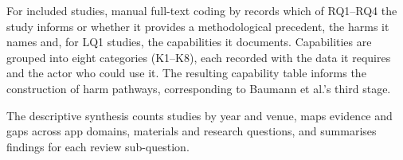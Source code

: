 For included studies, manual full-text coding by
\highlight[orange!25]{\textbf{[?]}} records which of RQ1--RQ4 the study informs or
whether it provides a methodological precedent, the harms it names and, for LQ1 studies, the
capabilities it documents. Capabilities are grouped into eight categories (K1--K8), each
recorded with the data it requires and the actor who could use it. The resulting capability
table informs the construction of harm pathways, corresponding to Baumann et al.'s third stage.

The descriptive synthesis counts studies by year and venue, maps evidence and gaps across app
domains, materials and research questions, and summarises findings for each review
sub-question.

